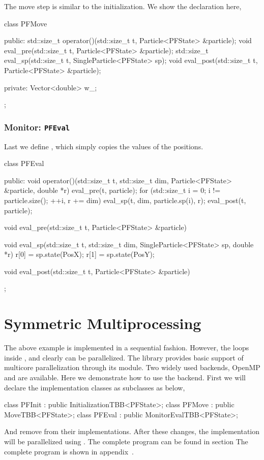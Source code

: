 The move step is similar to the initialization. We show the declaration here,
\begin{cppcode}
  class PFMove
  {
      public:
      std::size_t operator()(std::size_t t, Particle<PFState> &particle);
      void eval_pre(std::size_t t, Particle<PFState> &particle);
      std::size_t eval_sp(std::size_t t, SingleParticle<PFState> sp);
      void eval_post(std::size_t t, Particle<PFState> &particle);

      private:
      Vector<double> w_;
  };
\end{cppcode}

\subsubsection{Monitor: \texttt{PFEval}}

Last we define , which simply copies the values of the
positions.
\begin{cppcode}
  class PFEval
  {
      public:
      void operator()(std::size_t t, std::size_t dim,
          Particle<PFState> &particle, double *r)
      {
          eval_pre(t, particle);
          for (std::size_t i = 0; i != particle.size(); ++i, r += dim)
              eval_sp(t, dim, particle.sp(i), r);
          eval_post(t, particle);
      }

      void eval_pre(std::size_t t, Particle<PFState> &particle) {}

      void eval_sp(std::size_t t, std::size_t dim,
          SingleParticle<PFState> sp, double *r)
      {
          r[0] = sp.state(PosX);
          r[1] = sp.state(PosY);
      }

      void eval_post(std::size_t t, Particle<PFState> &particle) {}
  };
\end{cppcode}

\section{Symmetric Multiprocessing}
\label{sec:Symmetric Multiprocessing}

The above example is implemented in a sequential fashion. However, the loops
inside ,  and  clearly
can be parallelized. The library provides basic support of multicore
parallelization through its \smp module. Two widely used backends, OpenMP and
\tbb are available. Here we demonstrate how to use the \tbb backend. First we
will declare the implementation classes as subclasses as below,
\begin{cppcode}
  class PFInit : public InitializationTBB<PFState>;
  class PFMove : public MoveTBB<PFState>;
  class PFEval : public MonitorEvalTBB<PFState>;
\end{cppcode}
And remove  from their implementations. After these
changes, the implementation will be parallelized using \tbb. The complete
program can be found in section The complete program is shown in
appendix~.

